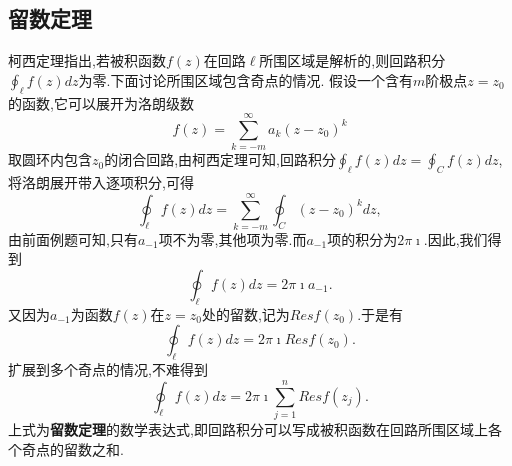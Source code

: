 \subsection{留数定理}
\label{subsec:residual_theorem}
柯西定理指出,若被积函数$f(z)$在回路$\ell$所围区域是解析的,则回路积分$\oint_\ell f(z) dz$为零.下面讨论所围区域包含奇点的情况.
假设一个含有$m$阶极点$z=z_0$的函数,它可以展开为洛朗级数
$$
  f(z) = \sum_{k = -m} ^{\infty} a_k (z - z_0)^k  
$$
取圆环内包含$z_0$的闭合回路,由柯西定理可知,回路积分$\oint_\ell f(z) dz = \oint_C f(z) dz$, 将洛朗展开带入逐项积分,可得
$$
\oint_\ell f(z) dz = \sum_{k = -m} ^{\infty} \oint_C  (z - z_0)^k dz,
$$
由前面例题可知,只有$a_{-1}$项不为零,其他项为零.而$a_{-1}$项的积分为$2\pi\imath$.因此,我们得到
\begin{equation}
    \oint_\ell f(z) dz = 2\pi \imath a_{-1} .
\end{equation}
又因为$a_{-1}$为函数$f(z)$在$z=z_0$处的留数,记为$Res f(z_0)$.于是有
\begin{equation}
    \oint_\ell f(z) dz = 2\pi \imath Res f(z_0) .
\end{equation}
扩展到多个奇点的情况,不难得到
\begin{equation}
    \oint_\ell f(z) dz = 2\pi \imath \sum_{j=1}^{n} Res f(z_j) .
\end{equation}
上式为\textbf{留数定理}的数学表达式,即回路积分可以写成被积函数在回路所围区域上各个奇点的留数之和.

